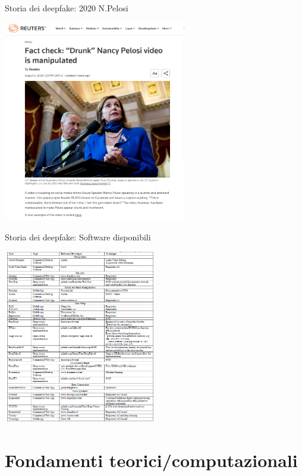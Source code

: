\documentclass[11pt]{beamer}
\begin{document}
\begin{frame}{Storia dei deepfake: 2020 N.Pelosi \cite{wsj_audio}}

\begin{center}
\includegraphics[width=0.6\textwidth]{Pic/fake_video_pelosi.png}
\end{center}

\end{frame}

\begin{frame}{Storia dei deepfake: Software disponibili \cite{masood2023deepfakes}}

\begin{center}
\includegraphics[width=0.5\textwidth]{Pic/deepfake_tools.png}
\end{center}

\end{frame}


\section{Fondamenti teorici/computazionali}
\end{document}

